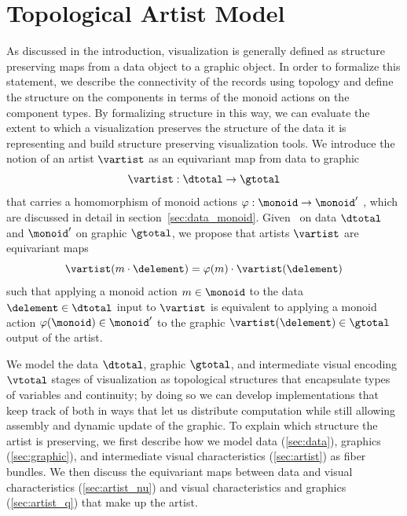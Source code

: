 \documentclass[../main.tex]{subfiles}
\begin{document}
\section{Topological Artist Model}
\label{sec:tam}

As discussed in the introduction, visualization is generally defined as structure preserving maps from a data object to a graphic object. In order to formalize this statement, we describe the connectivity of the records using topology and define the structure on the components in terms of the monoid actions on the component types. By formalizing structure in this way, we can evaluate the extent to which a visualization preserves the structure of the data it is representing and build structure preserving visualization tools. 
We introduce the notion of an artist $\mathscr{\vartist}$ as an equivariant map from data to graphic
\begin{equation}
    \label{eq:artist}
    \mathscr{\vartist}: \mathscr{\dtotal} \rightarrow \mathscr{\gtotal}
\end{equation}
that carries a homomorphism of monoid actions $\varphi: \monoid \rightarrow \monoid^{\prime}$ \cite{cegarraCohomologyMonoidsOperators2019}, which are discussed in detail in section~\ref{sec:data_monoid}. Given \monoid\ on data $\mathscr{\dtotal}$ and $\monoid^{\prime}$ on graphic $\mathscr{\gtotal}$, we propose that artists $\mathscr{\vartist}$ are equivariant maps 
\begin{equation}
\mathscr{\vartist}(m\cdot \delement) = \varphi(m)\cdot\mathscr{\vartist}(\delement) 
\end{equation}
such that applying a monoid action $m \in \monoid$ to the data $\delement \in \mathscr{\dtotal}$ input to $\mathscr{\vartist}$ is equivalent to applying a monoid action $\varphi(\monoid) \in \monoid^{\prime}$ to the graphic $\vartist(\delement) \in \mathscr{\gtotal}$ output of the artist.

We model the data $\mathscr{\dtotal}$, graphic $\mathscr{\gtotal}$, and intermediate visual encoding $\mathscr{\vtotal}$ stages of visualization as topological structures that encapsulate types of variables and continuity; by doing so we can develop implementations that keep track of both in ways that let us distribute computation while still allowing assembly and dynamic update of the graphic. To explain which structure the artist is preserving, we first describe how we model data (\ref{sec:data}), graphics (\ref{sec:graphic}), and intermediate visual characteristics (\ref{sec:artist}) as fiber bundles. We then discuss the equivariant maps between data and visual characteristics (\ref{sec:artist_nu}) and visual characteristics and graphics (\ref{sec:artist_q}) that make up the artist.
\end{document}
